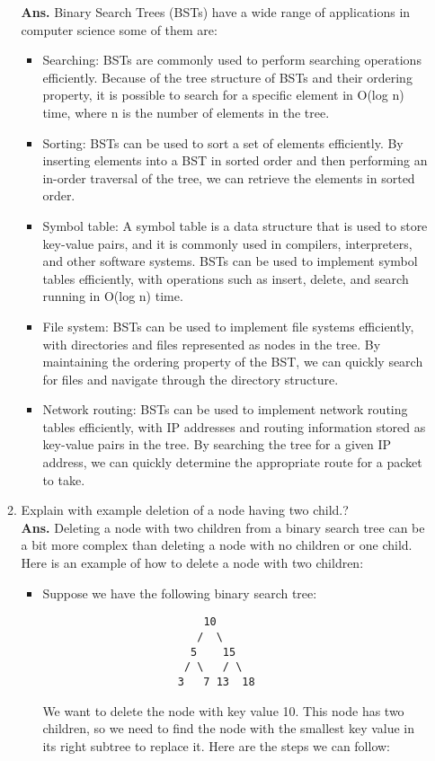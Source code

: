 \documentclass{article}
\begin{document}
\begin{enumerate}
\begin{enumerate}
		\textbf{Ans.} Binary Search Trees (BSTs) have a wide range of applications in computer science some of them are:
		\begin{itemize}
			\item Searching: BSTs are commonly used to perform searching operations efficiently. Because of the tree structure of BSTs and their ordering property, it is possible to search for a specific element in O(log n) time, where n is the number of elements in the tree.
			\item Sorting: BSTs can be used to sort a set of elements efficiently. By inserting elements into a BST in sorted order and then performing an in-order traversal of the tree, we can retrieve the elements in sorted order.
			\item Symbol table: A symbol table is a data structure that is used to store key-value pairs, and it is commonly used in compilers, interpreters, and other software systems. BSTs can be used to implement symbol tables efficiently, with operations such as insert, delete, and search running in O(log n) time.
			\item File system: BSTs can be used to implement file systems efficiently, with directories and files represented as nodes in the tree. By maintaining the ordering property of the BST, we can quickly search for files and navigate through the directory structure.
			\item Network routing: BSTs can be used to implement network routing tables efficiently, with IP addresses and routing information stored as key-value pairs in the tree. By searching the tree for a given IP address, we can quickly  determine the appropriate route for a packet to take.
		\end{itemize}
	
	\item Explain with example deletion of a node having two child.?\\
	
	\textbf{Ans.}  Deleting a node with two children from a binary search tree can be a bit more complex than deleting a node with no children or one child. Here is an example of how to delete a node with two children:
		\begin{itemize}
			\item Suppose we have the following binary search tree:
			\begin{lstlisting}
					     10
					    /  \
					   5    15
					  / \   / \
					 3   7 13  18
			\end{lstlisting}
			We want to delete the node with key value 10. This node has two children, so we need to find the node with the smallest key value in its right subtree to replace it. Here are the steps we can follow:\\
			

\end{itemize}
\end{enumerate}
\end{enumerate}
\end{document}
